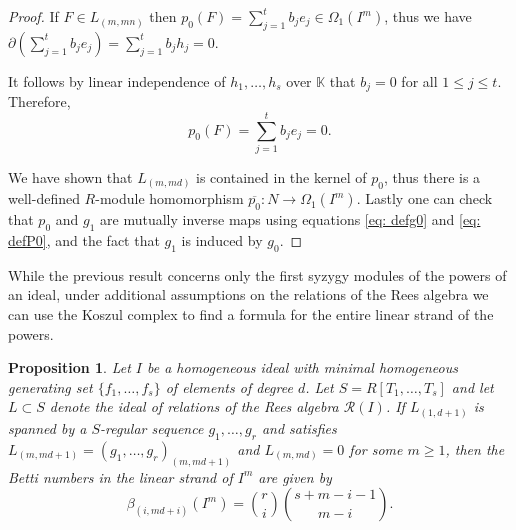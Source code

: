 \documentclass[reqno]{amsart}
\newtheorem{prop}[thm]{Proposition}
\theoremstyle{definition}
\theoremstyle{remark}
\numberwithin{equation}{section}
\begin{document}
\begin{proof}
    If $F\in L_{(m,mn)}$ then \(p_0(F)=\sum_{j=1}^t b_je_j\in\Omega_1(I^m)\), thus we have $\partial\left(\sum_{j=1}^t b_je_j \right)=\sum_{j=1}^t b_jh_j=0$.
 
    It follows by linear independence of $h_1, \ldots, h_s$ over $\mathbb{K}$ that \(b_j=0\) for all $1\leq j\leq t$. Therefore, \[p_0(F)=\sum_{j=1}^t b_je_j=0.\]
    
    We have shown that \(L_{(m,md)}\) is contained in the kernel of \(p_0\), thus  there is a well-defined $R$-module homomorphism $\overline{p_0}:N\to \Omega_1(I^m)$. 
    Lastly one can check that $p_0$ and $g_1$ are mutually inverse maps using equations \eqref{eq: defg0} and \eqref{eq: defP0}, and the fact that $g_1$ is induced by $g_0$.
\end{proof}

    
    While the previous result concerns only the first syzygy modules of the powers of an ideal, under additional assumptions on the relations of the Rees algebra  we can use the Koszul complex to find a formula for the entire linear strand of the powers. 

\begin{prop}\label{lem: linear strand}
    Let $I$ be a homogeneous ideal with  minimal homogeneous generating set $\{f_1, \dots, f_s\}$ of elements of degree $d$. Let $S = R[T_1, \ldots, T_s]$ and let $L\subset S$ denote the ideal of relations of the Rees algebra $\mathcal{R}(I)$. 
    If $L_{(1, d+1)}$ is spanned by a $S$-regular sequence $g_1, \dots, g_r$ and satisfies $L_{(m,md+1)}=(g_1, \dots, g_r)_{(m,md+1)}$ and $L_{(m,md)}=0$ for some $m\geq 1$, then  the Betti numbers in the linear strand of $I^m$ are given by 
    \[\beta_{(i, md+i)}(I^m) = \binom{r}{i}\binom{s+m-i-1}{m-i}.
    \]
\end{prop}
\end{document}
